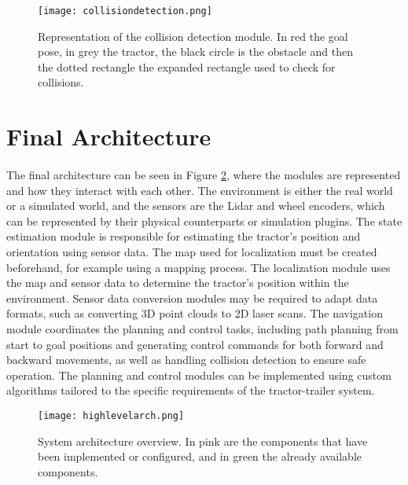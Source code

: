 \begin{figure}[h]
    \centering
    \texttt{[image: collisiondetection.png]}
    \caption{Representation of the collision detection module. In red the goal pose, in grey the tractor, the black circle is the obstacle and then the dotted rectangle the expanded rectangle used to check for collisions.}
    \label{fig:collisiondetection}
\end{figure}

\section{Final Architecture}
\label{sec:final_architecture}

\paragraph{}The final architecture can be seen in Figure \ref{fig:system_architecture}, 
where the modules are represented and how they interact with each other. The environment is either 
the real world or a simulated world, and the sensors are the Lidar and wheel encoders, 
which can be represented by their physical counterparts or simulation plugins. The state estimation module 
is responsible for estimating the tractor's position and orientation using sensor data. 
The map used for localization must be created beforehand, for example using a mapping process. The localization module 
uses the map and sensor data to determine the tractor's position within the environment. Sensor data conversion modules 
may be required to adapt data formats, such as converting 3D point clouds to 2D laser scans. The navigation module 
coordinates the planning and control tasks, including path planning from start to goal positions and generating control commands 
for both forward and backward movements, as well as handling collision detection to ensure safe operation. The planning and control modules 
can be implemented using custom algorithms tailored to the specific requirements of the tractor-trailer system.



\begin{figure}[h]
    \centering
    \texttt{[image: highlevelarch.png]}
    \caption{System architecture overview. In pink are the components that have been implemented or configured, and in green the already available components.}
    \label{fig:system_architecture}
\end{figure}
